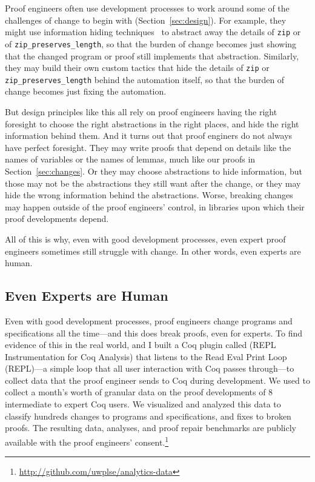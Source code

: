 Proof engineers often use development processes to work around some of the challenges of change to begin with (Section~\ref{sec:design}).
For example, they might use information hiding techniques~\cite{Woos:2016:PCF:2854065.2854081, Klein:2014:CFV:2584468.2560537}
to abstract away the details of \lstinline{zip} or of \lstinline{zip_preserves_length},
so that the burden of change becomes just showing that the changed program or proof still implements that abstraction.
Similarly, they may build their own custom tactics that hide the details of
\lstinline{zip} or \lstinline{zip_preserves_length} behind the automation itself,
so that the burden of change becomes just fixing the automation.

But design principles like this all rely on proof engineers having the right foresight to choose the 
right abstractions in the right places, and hide the right information behind them.
And it turns out that proof enginers do not always have perfect foresight.
They may write proofs that depend on details like the names of variables or the names of lemmas,
much like our proofs in Section~\ref{sec:changes}.
Or they may choose abstractions to hide information, but those may not be the abstractions they still want after the change,
or they may hide the wrong information behind the abstractions.
Worse, breaking changes may happen outside of the proof engineers' control,
in libraries upon which their proof developments depend.

All of this is why, even with good development processes, even expert proof engineers
sometimes still struggle with change.
In other words, even experts are human.

\subsection{Even Experts are Human}
\label{sec:irl}


Even with good development processes, proof engineers change programs and specifications all the time---and this does break proofs, 
even for experts.
To find evidence of this in the real world,  and I built a Coq plugin called \toolname 
(REPL Instrumentation for Coq Analysis) that listens to the Read Eval Print
Loop (REPL)---a simple loop that all user interaction with Coq passes through---to collect data that the proof engineer sends to Coq during development.
We used \toolname to collect a month's worth of granular data on 
the proof developments of 8 intermediate to expert Coq users.
We visualized and analyzed this data to classify hundreds changes to programs and specifications,
and fixes to broken proofs.
The resulting data, analyses, and proof repair benchmarks are publicly available with the proof engineers' 
consent.\footnote{\url{http://github.com/uwplse/analytics-data}}

